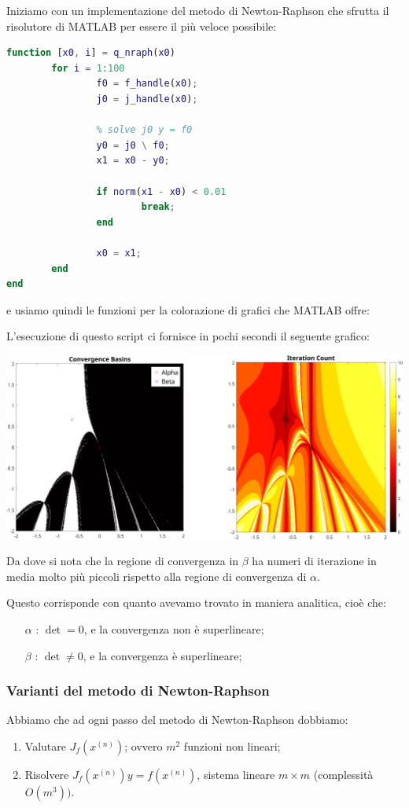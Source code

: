 \documentclass[a4paper,11pt]{article}
\begin{document}
\newpage

Iniziamo con un implementazione del metodo di Newton-Raphson che sfrutta il risolutore di MATLAB per essere il più veloce possibile:
\begin{lstlisting}[language=MATLAB, style=codestyle]	
function [x0, i] = q_nraph(x0)
		for i = 1:100
				f0 = f_handle(x0);
				j0 = j_handle(x0);

				% solve j0 y = f0
				y0 = j0 \ f0;
				x1 = x0 - y0;

				if norm(x1 - x0) < 0.01
						break;
				end

				x0 = x1;
		end
end
\end{lstlisting}
e usiamo quindi le funzioni per la colorazione di grafici che MATLAB offre:


\newpage

L'esecuzione di questo script ci fornisce in pochi secondi il seguente grafico:
\begin{center}
	\includegraphics[scale=0.4]{../figures/raphson_conv.png}
\end{center}

Da dove si nota che la regione di convergenza in $\beta$ ha numeri di iterazione in media molto più piccoli rispetto alla regione di convergenza di $\alpha$.

Questo corrisponde con quanto avevamo trovato in maniera analitica, cioè che:
\begin{itemize}
	\item[$\alpha$]: $\det = 0$, e la convergenza non è superlineare;
	\item[$\beta$]: $\det \neq 0$, e la convergenza è superlineare;
\end{itemize}

\subsubsection{Varianti del metodo di Newton-Raphson}
Abbiamo che ad ogni passo del metodo di Newton-Raphson dobbiamo:
\begin{enumerate}
	\item Valutare $J_f(x^{(n)})$; ovvero $m^2$ funzioni non lineari;
	\item Risolvere $J_f(x^{(n)}) y = f(x^{(n)})$, sistema lineare $m \times m$ (complessità $O(m^3))$.
\end{enumerate}
\end{document}
